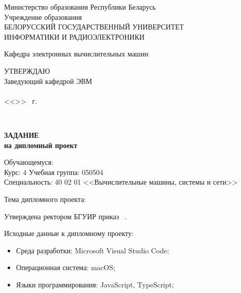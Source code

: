     \begin{center}
      Министерство образования Республики Беларусь\\[1em]
      Учреждение образования\\
      БЕЛОРУССКИЙ ГОСУДАРСТВЕННЫЙ УНИВЕРСИТЕТ \\
      ИНФОРМАТИКИ И РАДИОЭЛЕКТРОНИКИ\\[1em]
    \end{center}

    \begin{center}
      Кафедра электронных вычислительных машин
    \end{center}

    \begin{flushright}
      \begin{minipage}{0.4\textwidth}
        \MakeUppercase{Утверждаю}\\
        Заведующий кафедрой ЭВМ\\
        \underline{\hspace*{2.2cm}} \headOfDepartmentShort \\
        <<\underline{\hspace*{1cm}}>> \underline{\hspace*{2.5cm}} \targetYear\ г.
      \end{minipage}\\[1em]
    \end{flushright}

    \begin{center}
      \textbf{ЗАДАНИЕ}\\
      \textbf{на дипломный проект}\\[1em]
    \end{center}

    \noindent
    Обучающемуся: \studentFullTask \\
    Курс: 4 \hspace*{2ex} Учебная группа: 050504 \\
    Специальность: 40 02 01 <<Вычислительные машины, системы и сети>>

    \vspace{1em}
    \noindent
    Тема дипломного проекта: \taskNameFull

    \vspace{1em}
    \noindent
    Утверждена ректором БГУИР \uniDecreeDate приказ \textnumero \ \uniDecreeNumber.

    \vspace{1em}
    \noindent
    Исходные данные к дипломному проекту:
    \begin{itemize}[label={}, itemindent=\parindent]
      \item Среда разработки: Microsoft Visual Studio Code;
      \item Операционная система: macOS;
      \item Языки программирования: JavaScript, TypeScript;
    \end{itemize}

